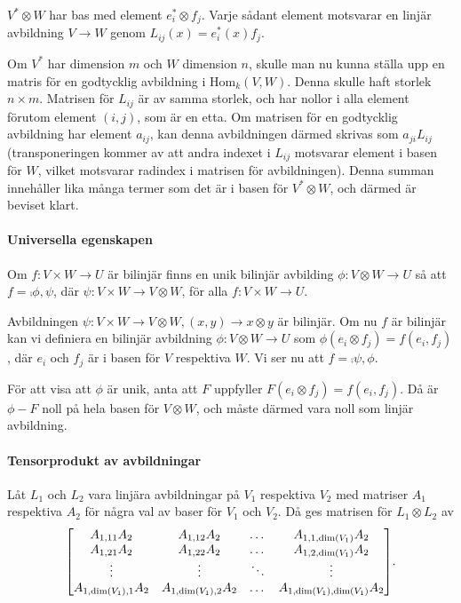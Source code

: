 \proof
$V^{*}\otimes W$ har bas med element $e_{i}^{*}\otimes f_{j}$. Varje sådant element motsvarar en linjär avbildning $V\to W$ genom $L_{ij}(x) = e_{i}^{*}(x) f_{j}$.

Om $V^{*}$ har dimension $m$ och $W$ dimension $n$, skulle man nu kunna ställa upp en matris för en godtycklig avbildning i $\text{Hom}_{k}(V, W)$. Denna skulle haft storlek $n\times m$. Matrisen för $L_{ij}$ är av samma storlek, och har nollor i alla element förutom element $(i, j)$, som är en etta. Om matrisen för en godtycklig avbildning har element $a_{ij}$, kan denna avbildningen därmed skrivas som $a_{ji}L_{ij}$ (transponeringen kommer av att andra indexet i $L_{ij}$ motsvarar element i basen för $W$, vilket motsvarar radindex i matrisen för avbildningen). Denna summan innehåller lika många termer som det är i basen för $V^{*}\otimes W$, och därmed är beviset klart.

\paragraph{Universella egenskapen}
Om $f: V\times W\to U$ är bilinjär finns en unik bilinjär avbilding $\phi: V\otimes W\to U$ så att $f = \comp{{\phi, \psi}}$, där $\psi: V\times W\to V\otimes W$, för alla $f: V\times W\to U$.

\proof
Avbildningen $\psi: V\times W\to V\otimes W, (x, y)\to x\otimes y$ är bilinjär. Om nu $f$ är bilinjär kan vi definiera en bilinjär avbildning $\phi: V\otimes W\to U$ som $\phi(e_{i}\otimes f_{j}) = f(e_{i}, f_{j})$, där $e_{i}$ och $f_{j}$ är i basen för $V$ respektiva $W$. Vi ser nu att $f = \comp{{\psi, \phi}}$.

För att visa att $\phi$ är unik, anta att $F$ uppfyller $F(e_{i}\otimes f_{j}) = f(e_{i}, f_{j})$. Då är $\phi - F$ noll på hela basen för $V\otimes W$, och måste därmed vara noll som linjär avbildning.

\paragraph{Tensorprodukt av avbildningar}
Låt $L_{1}$ och $L_{2}$ vara linjära avbildningar på $V_{1}$ respektiva $V_{2}$ med matriser $A_{1}$ respektiva $A_{2}$ för några val av baser för $V_{1}$ och $V_{2}$. Då ges matrisen för $L_{1}\otimes L_{2}$ av
\begin{align*}
	\mqty[
		A_{1, 11}A_{2}             & A_{1, 12}A_{2}             & \dots  & A_{1, 1, \dim{V_{1}}}A_{2} \\
		A_{1, 21}A_{2}             & A_{1, 22}A_{2}             & \dots  & A_{1, 2, \dim{V_{1}}}A_{2} \\
		\vdots                     & \vdots                     & \ddots & \vdots \\
		A_{1, \dim{V_{1}}, 1}A_{2} & A_{1, \dim{V_{1}}, 2}A_{2} & \dots  & A_{1, \dim{V_{1}}, \dim{V_{1}}}A_{2}
	].
\end{align*}

